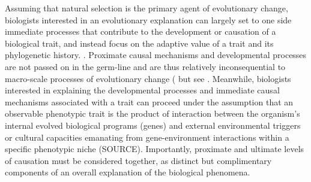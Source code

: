 Assuming that natural selection is the primary agent of evolutionary change, biologists interested in an evolutionary explanation can largely set to one side immediate processes that contribute to the development or causation of a biological trait, and instead focus on the adaptive value of a trait and its phylogenetic history. \citep{Mayr1961,Tinbergen1963}.  Proximate causal mechanisms and developmental processes are not passed on in the germ-line and are thus relatively inconsequential to macro-scale processes of evolutionary change (\citep{Dawkins1982,Grafen1991,Svensson2017} but see \citep{Laland2013,Laland2015}.  Meanwhile, biologists interested in explaining the developmental processes and immediate causal mechanisms associated with a trait can proceed under the assumption that an observable phenotypic trait is the product of interaction between the organism's internal evolved biological programs (genes) and external environmental triggers or cultural capacities emanating from gene-environment interactions within a specific phenotypic niche (SOURCE).  Importantly, proximate and ultimate levels of causation must be considered together, as distinct but complimentary components of an overall explanation of the biological phenomena\citep{Mayr1961,Tinbergen1963,Scott-Phillips2011}.


